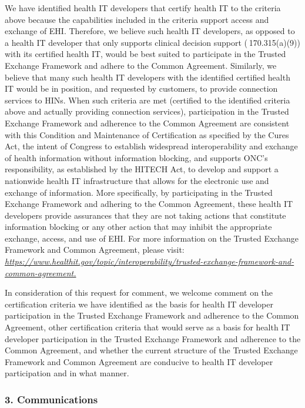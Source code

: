 \documentclass[twoside,11pt]{article}
\begin{document}
          We have identified health IT developers that certify health IT to the criteria above because the capabilities included in the criteria support access and exchange of EHI. Therefore, we believe such health IT developers, as opposed to a health IT developer that only supports clinical decision support (\textsection{} 170.315(a)(9)) with its certified health IT, would be best suited to participate in the Trusted Exchange Framework and adhere to the Common Agreement. Similarly, we believe that many such health IT developers with the identified certified health IT would be in position, and requested by customers, to provide connection services to HINs. When such criteria are met (certified to the identified criteria above and actually providing connection services), participation in the Trusted Exchange Framework and adherence to the Common Agreement are consistent with this Condition and Maintenance of Certification as specified by the Cures Act, the intent of Congress to establish widespread interoperability and exchange of health information without information blocking, and supports ONC's responsibility, as established by the HITECH Act, to develop and support a nationwide health IT infrastructure that allows for the electronic use and exchange of information. More specifically, by participating in the Trusted Exchange Framework and adhering to the Common Agreement, these health IT developers provide assurances that they are not taking actions that constitute information blocking or any other action that may inhibit the appropriate exchange, access, and use of EHI. For more information on the Trusted Exchange Framework and Common Agreement, please visit: \emph{\url{https://www.healthit.gov/topic/interoperability/trusted-exchange-framework-and-common-agreement.}}
          


          In consideration of this request for comment, we welcome comment on the certification criteria we have identified as the basis for health IT developer participation in the Trusted Exchange Framework and adherence to the Common Agreement, other certification criteria that would serve as a basis for health IT developer participation in the Trusted Exchange Framework and adherence to the Common Agreement, and whether the current structure of the Trusted Exchange Framework and Common Agreement are conducive to health IT developer participation and in what manner.


          \subsubsection{3. Communications}
\end{document}
